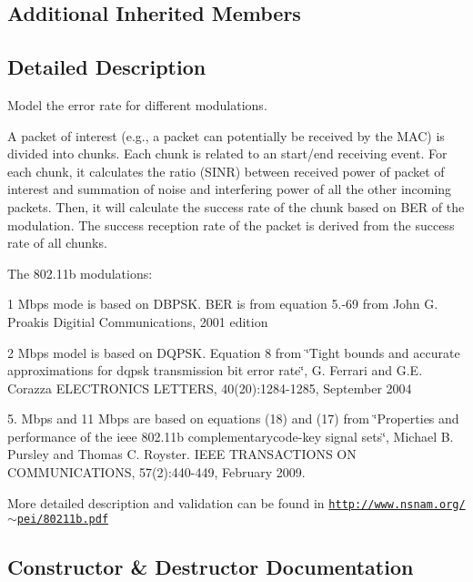 \subsection*{Additional Inherited Members}


\subsection{Detailed Description}
Model the error rate for different modulations.

A packet of interest (e.\+g., a packet can potentially be received by the M\+AC) is divided into chunks. Each chunk is related to an start/end receiving event. For each chunk, it calculates the ratio (S\+I\+NR) between received power of packet of interest and summation of noise and interfering power of all the other incoming packets. Then, it will calculate the success rate of the chunk based on B\+ER of the modulation. The success reception rate of the packet is derived from the success rate of all chunks. 

The 802.\+11b modulations\+:
\begin{DoxyItemize}
\item 1 Mbps mode is based on D\+B\+P\+SK. B\+ER is from equation 5.-\/69 from John G. Proakis Digitial Communications, 2001 edition
\item 2 Mbps model is based on D\+Q\+P\+SK. Equation 8 from \char`\"{}\+Tight bounds and accurate
     approximations for dqpsk transmission bit error rate\char`\"{}, G. Ferrari and G.\+E. Corazza E\+L\+E\+C\+T\+R\+O\+N\+I\+CS L\+E\+T\+T\+E\+RS, 40(20)\+:1284-\/1285, September 2004
\item 5. Mbps and 11 Mbps are based on equations (18) and (17) from \char`\"{}\+Properties and
     performance of the ieee 802.\+11b complementarycode-\/key signal sets\char`\"{}, Michael B. Pursley and Thomas C. Royster. I\+E\+EE T\+R\+A\+N\+S\+A\+C\+T\+I\+O\+NS ON C\+O\+M\+M\+U\+N\+I\+C\+A\+T\+I\+O\+NS, 57(2)\+:440-\/449, February 2009.
\item More detailed description and validation can be found in \href{http://www.nsnam.org/~pei/80211b.pdf}{\tt http\+://www.\+nsnam.\+org/$\sim$pei/80211b.\+pdf} 
\end{DoxyItemize}

\subsection{Constructor \& Destructor Documentation}
